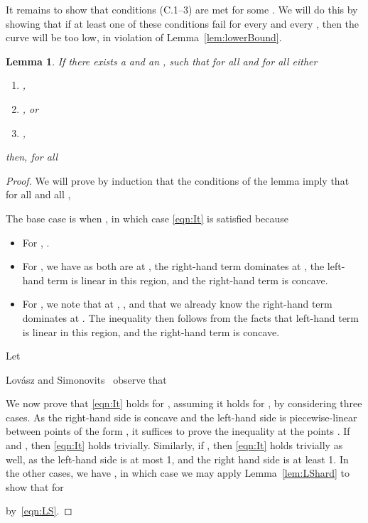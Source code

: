 \documentclass[11pt]{article}
\newtheorem{lemma}[theorem]{Lemma}
\begin{document}
It remains to show that conditions (C.1--3) are met for some
  .
We will do this by showing that if at least one of these
  conditions fail for every  and every
  ,
  then the curve  will be too low, in violation
  of Lemma~\ref{lem:lowerBound}.

\begin{lemma}\label{lem:C1help}
If there exists a  and an
 , 
  such that for all
   and for all 
  either
\begin{enumerate}
\item [1.]  ,
\item [2.] , or
\item [3.] , 
\end{enumerate}
then, for all 

\end{lemma}
\begin{proof}
We will prove by induction that the conditions of the lemma
  imply that for all  and
  all ,

The base case is when , in which case
  \eqref{eqn:It} is satisfied because
\begin{itemize}
\item For ,
  .
\item For ,
  we have  as both are 
  at , the right-hand term dominates at , the
  left-hand term is linear in this region, and the right-hand term is concave.

\item For ,
  we note that at ,
  , and that
  we already know the right-hand term dominates  at .
  The inequality then follows from the facts that
  left-hand term is linear in this region, and the right-hand term is concave.
\end{itemize}

Let

Lov\'asz and Simonovits~\cite{LovaszSimonovitsFOCS} observe that

We now prove that \eqref{eqn:It} holds for , assuming it holds for ,
  by considering three cases.
As the right-hand side is concave and the left-hand side is piecewise-linear
  between points of the form ,
  it suffices to prove the inequality at the points
  .
If  and 
  , then \eqref{eqn:It} holds trivially.
Similarly, if ,
  then \eqref{eqn:It} holds trivially as well, as
  the left-hand side is at most 1, and the right hand side is at least 1.
In the other cases, we have ,
  in which case we may apply Lemma~\ref{lem:LShard} to show
  that for 

by~\eqref{eqn:LS}.
\end{proof}
\end{document}
